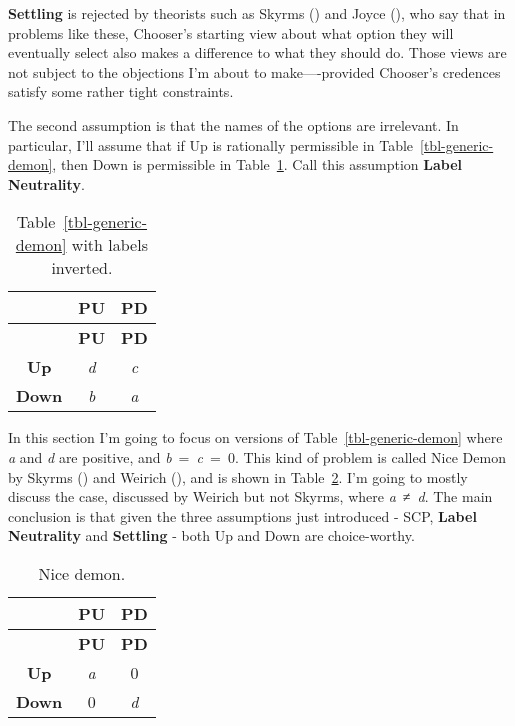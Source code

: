 \documentclass[
  10pt,
  letterpaper,
  DIV=11,
  numbers=noendperiod,
  twoside]{scrartcl}
\begin{document}
\textbf{Settling} is rejected by theorists such as Skyrms
() and Joyce
(), who say that in problems like these,
Chooser's starting view about what option they will eventually select
also makes a difference to what they should do. Those views are not
subject to the objections I'm about to make----provided Chooser's
credences satisfy some rather tight constraints.

The second assumption is that the names of the options are irrelevant.
In particular, I'll assume that if Up is rationally permissible in
Table~\ref{tbl-generic-demon}, then Down is permissible in
Table~\ref{tbl-inverted-generic}. Call this assumption \textbf{Label
Neutrality}.

\begin{longtable}[]{@{}ccc@{}}
\caption{Table~\ref{tbl-generic-demon} with labels
inverted.}\label{tbl-inverted-generic}\tabularnewline
\toprule\noalign{}
& \textbf{PU} & \textbf{PD} \\
\midrule\noalign{}
\endfirsthead
\toprule\noalign{}
& \textbf{PU} & \textbf{PD} \\
\midrule\noalign{}
\endhead
\bottomrule\noalign{}
\endlastfoot
\textbf{Up} & \emph{d} & \emph{c} \\
\textbf{Down} & \emph{b} & \emph{a} \\
\end{longtable}

In this section I'm going to focus on versions of
Table~\ref{tbl-generic-demon} where \emph{a} and \emph{d} are positive,
and \emph{b}~=~\emph{c}~=~0. This kind of problem is called Nice Demon
by Skyrms () and Weirich
(), and is shown in
Table~\ref{tbl-nice-demon}. I'm going to mostly discuss the case,
discussed by Weirich but not Skyrms, where \emph{a}~≠~\emph{d}. The main
conclusion is that given the three assumptions just introduced - SCP,
\textbf{Label Neutrality} and \textbf{Settling} - both Up and Down are
choice-worthy.

\begin{longtable}[]{@{}ccc@{}}
\caption{Nice demon.}\label{tbl-nice-demon}\tabularnewline
\toprule\noalign{}
& \textbf{PU} & \textbf{PD} \\
\midrule\noalign{}
\endfirsthead
\toprule\noalign{}
& \textbf{PU} & \textbf{PD} \\
\midrule\noalign{}
\endhead
\bottomrule\noalign{}
\endlastfoot
\textbf{Up} & \emph{a} & 0 \\
\textbf{Down} & 0 & \emph{d} \\
\end{longtable}
\end{document}
